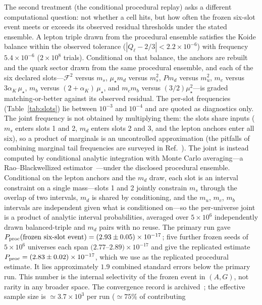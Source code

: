 \documentclass[aps,twocolumn,superscriptaddress,nofootinbib,floatfix]{revtex4-2}
\newcommand{\mstar}{\mu_\star}
\newcommand{\alphaK}{\alpha_K}
\begin{document}
The second treatment (the conditional procedural replay) asks a different computational question: not whether a cell hits, but how often the frozen six-slot event meets or exceeds its observed residual thresholds under the stated ensemble. A lepton triple drawn from the procedural ensemble satisfies the Koide
balance within the observed tolerance ($|Q_\ell-2/3|<2.2\times10^{-6}$) with
frequency $5.4\times10^{-6}$ ($2\times10^8$ trials). Conditional on that
balance, the anchors are rebuilt and the quark sector drawn from the same procedural ensemble,
and each of the six declared slots---$\mathcal{F}^2$ versus $m_s$, $\mstar
m_d$ versus $m_s^2$, $P m_d$ versus $m_u^2$, $m_c$ versus $3\alphaK\,\mstar$,
$m_b$ versus $(2+\alphaK)\,\mstar$, and $m_c m_b$ versus $(3/2)\mstar^2$---is
graded matching-or-better against its observed residual. The per-slot frequencies (Table~\ref{tab:slots}) lie between $10^{-3}$
and $10^{-4}$ and are quoted as diagnostics only. The joint frequency is
not obtained by multiplying them: the slots share inputs ($m_s$ enters
slots 1 and 2, $m_d$ enters slots 2 and 3, and the lepton anchors enter
all six), so a product of marginals is an uncontrolled
approximation (the pitfalls of combining marginal tail frequencies
are surveyed in Ref.~\cite{Cousins2007}).
The joint is instead computed by conditional analytic integration with
Monte Carlo averaging---a Rao--Blackwellized
estimator~\cite{CasellaRobert1996}---under the disclosed procedural ensemble.
Conditional on the lepton anchors and the $m_d$ draw, each slot is an
interval constraint on a single mass---slots 1 and 2 jointly constrain
$m_s$ through the overlap of two intervals, $m_d$ is shared by
conditioning, and the $m_u$, $m_c$, $m_b$ intervals are independent
given what is conditioned on---so the per-universe joint is a product of
analytic interval probabilities, averaged over $5\times10^6$
independently drawn balanced-triple and $m_d$ pairs with no reuse. The primary run gave
$P_{\rm proc}(\text{frozen six-slot event})=(2.93\pm0.05)\times10^{-17}$;
five further frozen seeds of $5\times10^6$ universes each span
$(2.77$--$2.89)\times10^{-17}$ and give the replicated estimate
$P_{\rm proc}=(2.83\pm0.02)\times10^{-17}$,
which we use as the replicated procedural estimate. It lies approximately $1.9$ combined standard errors below the primary run. This number is the internal selectivity of the frozen event in $(A,G)$, not rarity in any broader space. The convergence record is archived~\cite{BrilliantGitHubEnum}; the effective sample size
is $\simeq3.7\times10^3$ per run ($\simeq75\%$ of contributing
\end{document}
